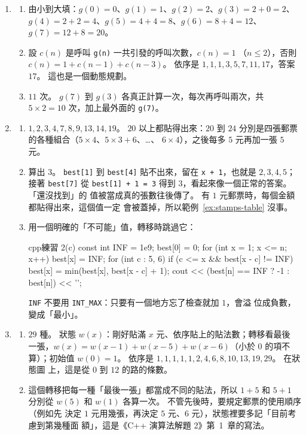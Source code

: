 \begin{enumerate}
\item
\begin{enumerate}
\item 由小到大填：$g(0) = 0$、$g(1) = 1$、$g(2) = 2$、$g(3) = 2 + 0 = 2$、
$g(4) = 2 + 2 = 4$、$g(5) = 4 + 4 = 8$、$g(6) = 8 + 4 = 12$、
$g(7) = 12 + 8 = 20$。
\item 設 $c(n)$ 是呼叫 \texttt{g(n)} 一共引發的呼叫次數，$c(n) = 1$
（$n \le 2$），否則 $c(n) = 1 + c(n - 1) + c(n - 3)$。 依序是
$1, 1, 1, 3, 5, 7, 11, 17$，答案 $17$。 這也是一個動態規劃。
\item $11$ 次。 $g(7)$ 到 $g(3)$ 各真正計算一次，每次再呼叫兩次，共
$5 \times 2 = 10$ 次，加上最外面的 \texttt{g(7)}。
\end{enumerate}

\item
\begin{enumerate}
\item $1, 2, 3, 4, 7, 8, 9, 13, 14, 19$。 $20$ 以上都貼得出來：$20$ 到 $24$
分別是四張郵票的各種組合（$5 \times 4$、$5 \times 3 + 6$、\ldots、
$6 \times 4$），之後每多 $5$ 元再加一張 $5$ 元。
\item 算出 $3$。 \texttt{best[1]} 到 \texttt{best[4]} 貼不出來，留在
\texttt{x + 1}，也就是 $2, 3, 4, 5$；接著 \texttt{best[7]} 從
\texttt{best[1] + 1 = 3} 得到 $3$，看起來像一個正常的答案。 「還沒找到」的
值被當成真的張數往後傳了。 有 $1$ 元郵票時，每個金額都貼得出來，這個值一定
會被蓋掉，所以範例~\ref{ex:stamps-table} 沒事。
\item 用一個明確的「不可能」值，轉移時跳過它：
\begin{code}{cpp}{練習 2(c)}
const int INF = 1e9;
best[0] = 0;
for (int x = 1; x <= n; x++) {
    best[x] = INF;
    for (int c : {5, 6}) {
        if (c <= x && best[x - c] != INF) {
            best[x] = min(best[x], best[x - c] + 1);
        }
    }
}
cout << (best[n] == INF ? -1 : best[n]) << '\n';
\end{code}
\texttt{INF} 不要用 \texttt{INT\_MAX}：只要有一個地方忘了檢查就加 $1$，會溢
位成負數，變成「最小」。
\end{enumerate}

\item
\begin{enumerate}
\item $29$ 種。 狀態 $w(x)$：剛好貼滿 $x$ 元、依序貼上的貼法數；轉移看最後
一張，$w(x) = w(x - 1) + w(x - 5) + w(x - 6)$（小於 $0$ 的項不算）；初始值
$w(0) = 1$。 依序是 $1, 1, 1, 1, 1, 2, 4, 6, 8, 10, 13, 19, 29$。 在狀態圖
上，這是從 $0$ 到 $12$ 的路的條數。
\item 這個轉移把每一種「最後一張」都當成不同的貼法，所以 $1 + 5$ 和 $5 + 1$
分別從 $w(5)$ 和 $w(1)$ 各算一次。 不管先後時，要規定郵票的使用順序（例如先
決定 $1$ 元用幾張，再決定 $5$ 元、$6$ 元），狀態裡要多記「目前考慮到第幾種面
額」，這是《C++ 演算法解題 2》第~1~章的寫法。
\end{enumerate}


\end{enumerate}
